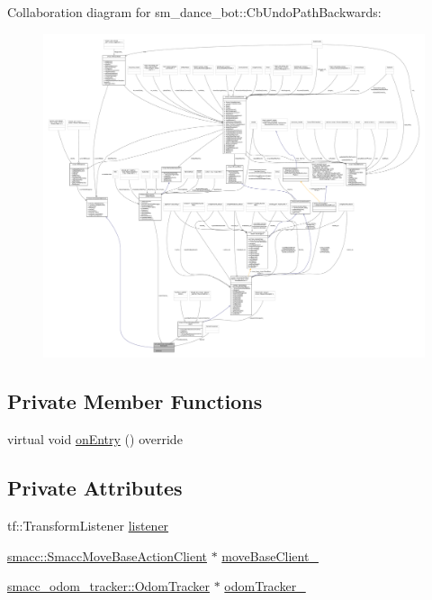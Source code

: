 Collaboration diagram for sm\+\_\+dance\+\_\+bot\+:\+:Cb\+Undo\+Path\+Backwards\+:
\nopagebreak
\begin{figure}[H]
\begin{center}
\leavevmode
\includegraphics[width=350pt]{classsm__dance__bot_1_1CbUndoPathBackwards__coll__graph}
\end{center}
\end{figure}
\subsection*{Private Member Functions}
\begin{DoxyCompactItemize}
\item 
virtual void \hyperlink{classsm__dance__bot_1_1CbUndoPathBackwards_a5ecdf83df96ab3d74eb4e4febea7fa74}{on\+Entry} () override
\end{DoxyCompactItemize}
\subsection*{Private Attributes}
\begin{DoxyCompactItemize}
\item 
tf\+::\+Transform\+Listener \hyperlink{classsm__dance__bot_1_1CbUndoPathBackwards_a35aa53997f49c33d11a43cca81a72dfd}{listener}
\item 
\hyperlink{classsmacc_1_1SmaccMoveBaseActionClient}{smacc\+::\+Smacc\+Move\+Base\+Action\+Client} $\ast$ \hyperlink{classsm__dance__bot_1_1CbUndoPathBackwards_ae4f1221bbc5eabbaf86b00e61c7bca1b}{move\+Base\+Client\+\_\+}
\item 
\hyperlink{classsmacc__odom__tracker_1_1OdomTracker}{smacc\+\_\+odom\+\_\+tracker\+::\+Odom\+Tracker} $\ast$ \hyperlink{classsm__dance__bot_1_1CbUndoPathBackwards_a51cc8ec7a7e9da1f3cb4c1816b382af9}{odom\+Tracker\+\_\+}
\end{DoxyCompactItemize}
